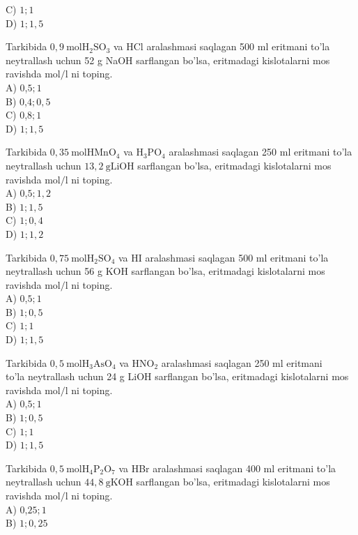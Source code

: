 C) $1 ; 1$\\
D) $1 ; 1,5$
  \item Tarkibida $0,9 \mathrm{~mol} \mathrm{H}_{2} \mathrm{SO}_{3}$ va HCl aralashmasi saqlagan 500 ml eritmani to'la neytrallash uchun 52 g NaOH sarflangan bo'lsa, eritmadagi kislotalarni mos ravishda $\mathrm{mol} / \mathrm{l}$ ni toping.\\
A) 0,$5 ; 1$\\
B) 0,$4 ; 0,5$\\
C) 0,$8 ; 1$\\
D) $1 ; 1,5$
  \item Tarkibida $0,35 \mathrm{~mol} \mathrm{HMnO}_{4}$ va $\mathrm{H}_{3} \mathrm{PO}_{4}$ aralashmasi saqlagan 250 ml eritmani to'la neytrallash uchun $13,2 \mathrm{~g} \mathrm{LiOH}$ sarflangan bo'lsa, eritmadagi kislotalarni mos ravishda $\mathrm{mol} / \mathrm{l}$ ni toping.\\
A) 0,$5 ; 1,2$\\
B) $1 ; 1,5$\\
C) $1 ; 0,4$\\
D) $1 ; 1,2$
  \item Tarkibida $0,75 \mathrm{~mol} \mathrm{H}_{2} \mathrm{SO}_{4}$ va HI aralashmasi saqlagan 500 ml eritmani to'la neytrallash uchun 56 g KOH sarflangan bo'lsa, eritmadagi kislotalarni mos ravishda $\mathrm{mol} / \mathrm{l}$ ni toping.\\
A) 0,$5 ; 1$\\
B) $1 ; 0,5$\\
C) $1 ; 1$\\
D) $1 ; 1,5$
  \item Tarkibida $0,5 \mathrm{~mol} \mathrm{H}_{3} \mathrm{AsO}_{4}$ va $\mathrm{HNO}_{2}$ aralashmasi saqlagan 250 ml eritmani\\
to'la neytrallash uchun 24 g LiOH sarflangan bo'lsa, eritmadagi kislotalarni mos ravishda $\mathrm{mol} / \mathrm{l}$ ni toping.\\
A) 0,$5 ; 1$\\
B) $1 ; 0,5$\\
C) $1 ; 1$\\
D) $1 ; 1,5$
  \item Tarkibida $0,5 \mathrm{~mol} \mathrm{H}_{4} \mathrm{P}_{2} \mathrm{O}_{7}$ va HBr aralashmasi saqlagan 400 ml eritmani to'la neytrallash uchun $44,8 \mathrm{~g} \mathrm{KOH}$ sarflangan bo'lsa, eritmadagi kislotalarni mos ravishda $\mathrm{mol} / \mathrm{l}$ ni toping.\\
A) 0,$25 ; 1$\\
B) $1 ; 0,25$\\
